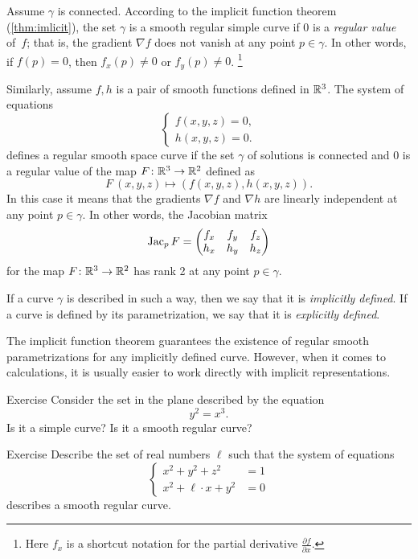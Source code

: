 Assume $\gamma$ is connected.
According to the implicit function theorem (\ref{thm:imlicit}), the set $\gamma$ is a smooth regular simple curve if $0$ is a \emph{regular value} of~$f$; that is, the gradient $\nabla f$ does not vanish at any point $p\in \gamma$.
In other words, if $f(p)=0$, then   
$f_x(p)\ne 0$ or $f_y(p)\ne 0$.%
\footnote{Here $f_x$ is a shortcut notation for the partial derivative
$\tfrac{\partial f}{\partial x}$.}

Similarly, assume $f,h$ is a pair of smooth functions defined in $\mathbb{R}^3$.
The system of equations
\[\begin{cases}
   f(x,y,z)=0,
   \\
   h(x,y,z)=0.
  \end{cases}
\]
defines a regular smooth space curve if the set $\gamma$ of solutions is connected and $0$ is a regular value of the map $F\colon\mathbb{R}^3\to\mathbb{R}^2$ defined as
\[F\:(x,y,z)\mapsto (f(x,y,z),h(x,y,z)).\]
In this case it means that the gradients $\nabla f$ and $\nabla h$ are linearly independent at any point $p\in \gamma$.
In other words, the Jacobian matrix
\[
\mathop{\rm Jac}\nolimits_pF=\begin{pmatrix}
f_x&f_y&f_z\\
h_x&h_y&h_z
\end{pmatrix}
\]
for the map $F\colon\mathbb{R}^3\to\mathbb{R}^2$ has rank 2 at any point $p \in \gamma$.

If a curve $\gamma$ is described in such a way,
then we say that it is \emph{implicitly defined}.
If a curve is defined by its parametrization, we say that it is \emph{explicitly defined}.

The implicit function theorem guarantees the existence of regular smooth parametrizations for any implicitly defined curve.
However, when it comes to calculations, it is usually easier to work directly with implicit representations. 

\begin{thm}{Exercise}\label{ex:y^2=x^3}
Consider the set in the plane described by the equation
\[y^2=x^3.\]
Is it a simple curve?
Is it a smooth regular curve?
\end{thm}

\begin{thm}{Exercise}\label{ex:viviani}
Describe the set of real numbers $\ell$
such that the system of equations
\[\begin{cases}
x^2+y^2+z^2&=1
\\
x^2+\ell\cdot x+y^2&=0
\end{cases}\]
describes a smooth regular curve.
\end{thm}

